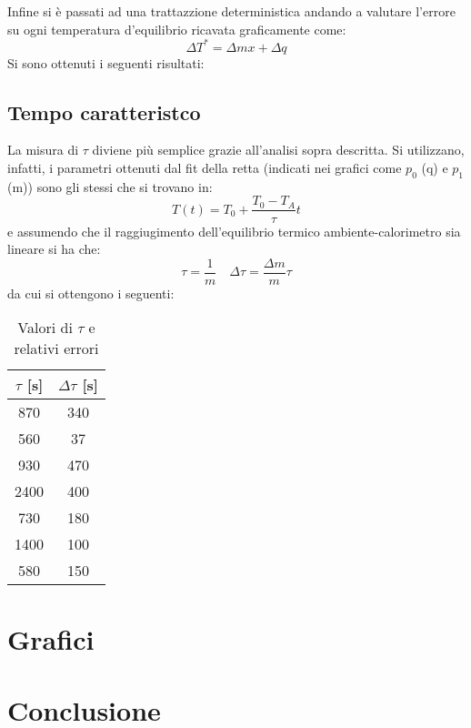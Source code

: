 \documentclass[10pt,twocolumn]{article}
\begin{document}
Infine si è passati ad una trattazzione deterministica andando a valutare l'errore su ogni temperatura d'equilibrio ricavata graficamente come:
\[
\Delta T^*= \Delta m x + \Delta q
\]
Si sono ottenuti i seguenti risultati:
\begin{table}[H]
\begin{scriptsize}
\noindent
{}
\end{scriptsize}
\end{table}

\subsection{Tempo caratteristco}
La misura di $\tau$ diviene più semplice grazie all'analisi sopra descritta. Si utilizzano, infatti, i parametri ottenuti dal fit della retta (indicati nei grafici come $p_0$ (q) e $p_1$ (m)) sono gli stessi che si trovano in:
\[
T(t)=T_0 + \frac{T_0-T_A}{\tau}t
\]
e assumendo che il raggiugimento dell'equilibrio termico ambiente-calorimetro sia lineare si ha che:
\begin{equation*}
\tau=\frac{1}{m} \quad \Delta \tau= \frac{\Delta m}{m}\tau
\end{equation*}
da cui si ottengono i seguenti:
\begin{table}[h]
\centering
\caption*{Valori di $\tau$ e relativi errori}
\begin{tabular}{|c|c|}
\hline
$\tau$ [s] &  $\Delta \tau$ [s] \\
\hline
870 & 340 \\ \hline
560 & 37 \\ \hline
930 & 470 \\ \hline
2400 & 400 \\ \hline
730 & 180 \\ \hline
1400 & 100 \\ \hline
580 & 150 \\
\hline
\end{tabular}
\end{table}
\pagebreak
\section{Grafici}
\section{Conclusione}
\end{document}
